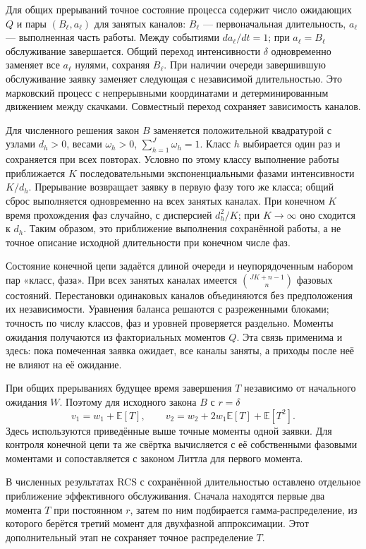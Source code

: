 \documentclass[a4paper,12pt]{article}
\begin{document}
Для общих прерываний точное состояние процесса содержит число ожидающих \(Q\) и пары \((B_\ell,a_\ell)\) для занятых каналов: \(B_\ell\) --- первоначальная длительность, \(a_\ell\) --- выполненная часть работы. Между событиями \(da_\ell/dt=1\); при \(a_\ell=B_\ell\) обслуживание завершается. Общий переход интенсивности \(\delta\) одновременно заменяет все \(a_\ell\) нулями, сохраняя \(B_\ell.\) При наличии очереди завершившую обслуживание заявку заменяет следующая с независимой длительностью. Это марковский процесс с непрерывными координатами и детерминированным движением между скачками. Совместный переход сохраняет зависимость каналов.

Для численного решения закон \(B\) заменяется положительной квадратурой с узлами \(d_h>0\), весами \(\omega_h>0\), \(\sum_{h=1}^J\omega_h=1.\) Класс \(h\) выбирается один раз и сохраняется при всех повторах. Условно по этому классу выполнение работы приближается \(K\) последовательными экспоненциальными фазами интенсивности \(K/d_h.\) Прерывание возвращает заявку в первую фазу того же класса; общий сброс выполняется одновременно на всех занятых каналах. При конечном \(K\) время прохождения фаз случайно, с дисперсией \(d_h^2/K\); при \(K\to\infty\) оно сходится к \(d_h.\) Таким образом, это приближение выполнения сохранённой работы, а не точное описание исходной длительности при конечном числе фаз.

Состояние конечной цепи задаётся длиной очереди и неупорядоченным набором пар «класс, фаза». При всех занятых каналах имеется \(\binom{JK+n-1}{n}\) фазовых состояний. Перестановки одинаковых каналов объединяются без предположения их независимости. Уравнения баланса решаются с разреженными блоками; точность по числу классов, фаз и уровней проверяется раздельно. Моменты ожидания получаются из факториальных моментов \(Q.\) Эта связь применима и здесь: пока помеченная заявка ожидает, все каналы заняты, а приходы после неё не влияют на её ожидание.

При общих прерываниях будущее время завершения \(T\) независимо от начального ожидания \(W.\) Поэтому для исходного закона \(B\) с \(r=\delta\)
\[
v_1=w_1+\mathbb E[T],\qquad
v_2=w_2+2w_1\mathbb E[T]+\mathbb E[T^2].
\]
Здесь используются приведённые выше точные моменты одной заявки. Для контроля конечной цепи та же свёртка вычисляется с её собственными фазовыми моментами и сопоставляется с законом Литтла для первого момента.

В численных результатах RCS с сохранённой длительностью оставлено отдельное приближение эффективного обслуживания. Сначала находятся первые два момента \(T\) при постоянном \(r\), затем по ним подбирается гамма-распределение, из которого берётся третий момент для двухфазной аппроксимации. Этот дополнительный этап не сохраняет точное распределение \(T.\)
\end{document}

